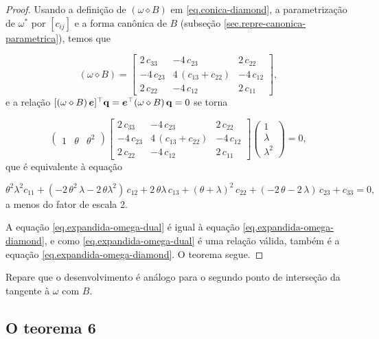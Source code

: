 \begin{proof}
Usando a definição de $(\omega\diamond B)$ em \ref{eq.conica-diamond}, a parametrização de $\omega^*$ por $[c_{ij}]$ e a forma canônica de $B$ (subseção \ref{sec.repre-canonica-parametrica}), temos que

\begin{equation*}
(\omega\diamond B)=
\begin{bmatrix}
2\,c_{33}&-4\,c_{23}&2\,c_{22}\\
-4\,c_{23}&4\,(c_{13}+c_{22})&-4\,c_{12}\\
2\,c_{22}&-4\,c_{12}&2\,c_{11}
\end{bmatrix},
\end{equation*}
e a relação $[(\omega\diamond B)\,\boldsymbol{e}]^\top {\bf q}=\boldsymbol{e}^\top (\omega\diamond B)\,{\bf q}=0$ se torna

\begin{equation*}
\begin{pmatrix}
1&\theta&\theta^2
\end{pmatrix}
\begin{bmatrix}
2\,c_{33}&-4\,c_{23}&2\,c_{22}\\
-4\,c_{23}&4\,(c_{13}+c_{22})&-4\,c_{12}\\
2\,c_{22}&-4\,c_{12}&2\,c_{11}
\end{bmatrix}
\begin{pmatrix}
1\\
\lambda\\
\lambda^2
\end{pmatrix}
=0,
\end{equation*}
que é equivalente à equação

\begin{equation}\label{eq.expandida-omega-diamond}
\theta^2\lambda^2 c_{11}+(-2\,\theta^2\,\lambda-2\,\theta\lambda^2)\,c_{12}+2\,\theta\lambda\,c_{13}+(\theta+\lambda)^2\,c_{22}+(-2\,\theta-2\,\lambda)\,c_{23}+c_{33}=0,
\end{equation}
a menos do fator de escala 2.

A equação \ref{eq.expandida-omega-dual} é igual à equação \ref{eq.expandida-omega-diamond}, e como 
\ref{eq.expandida-omega-dual} é uma relação válida, também é a equação \ref{eq.expandida-omega-diamond}. O teorema segue.
\end{proof}
Repare que o desenvolvimento é análogo para o segundo ponto de interseção da tangente à $\omega$ com $B$.


\subsection{O teorema 6}\label{sec.teorema-6}

